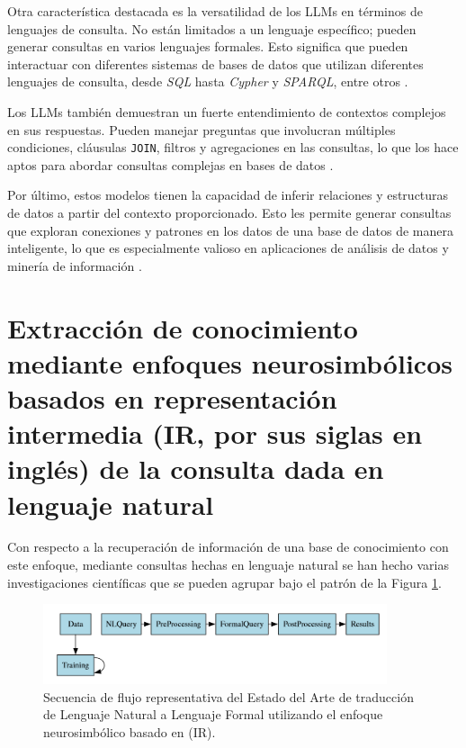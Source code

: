 Otra característica destacada es la versatilidad de los LLMs en términos de lenguajes de consulta. No están limitados a un lenguaje específico; pueden generar consultas en varios lenguajes formales. Esto significa que pueden interactuar con diferentes sistemas de bases de datos que utilizan diferentes lenguajes de consulta, desde \textit{SQL} hasta \textit{Cypher} y \textit{SPARQL}, entre otros \cite{wangetal2021}.

Los LLMs también demuestran un fuerte entendimiento de contextos complejos en sus respuestas. Pueden manejar preguntas que involucran múltiples condiciones, cláusulas \texttt{JOIN}, filtros y agregaciones en las consultas, lo que los hace aptos para abordar consultas complejas en bases de datos \cite{mehri2019}.

Por último, estos modelos tienen la capacidad de inferir relaciones y estructuras de datos a partir del contexto proporcionado. Esto les permite generar consultas que exploran conexiones y patrones en los datos de una base de datos de manera inteligente, lo que es especialmente valioso en aplicaciones de análisis de datos y minería de información \cite{brownetal2020}.

\section{Extracción de conocimiento mediante enfoques neurosimbólicos basados en representación intermedia (IR, por sus siglas en inglés) de la consulta dada en lenguaje natural} \label{neurosymbolic_approach}

Con respecto a la recuperación de información de una base de conocimiento con este enfoque, mediante consultas hechas en lenguaje natural se han hecho varias investigaciones científicas que se pueden agrupar bajo el patrón de la Figura \ref{neurosym_approach}.

\begin{figure}[!h]\label{neurosym_approach}
	\centering
	\includegraphics[width = 0.9\textwidth]{./Graphics/neurosym_approach}
	\caption{Secuencia de flujo representativa del Estado del Arte de traducción de
Lenguaje Natural a Lenguaje Formal utilizando el enfoque neurosimbólico basado en (IR).}
\end{figure}

